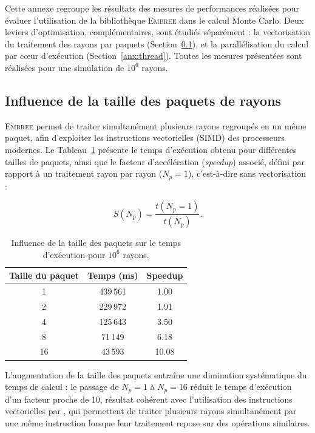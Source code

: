 Cette annexe regroupe les résultats des mesures de performances réalisées pour évaluer l'utilisation de la bibliothèque \textsc{Embree} dans le calcul Monte Carlo. Deux leviers d'optimisation, complémentaires, sont étudiés séparément : la vectorisation du traitement des rayons par paquets (Section~\ref{anx:packet}), et la parallélisation du calcul par c\oe ur d'exécution (Section~\ref{anx:thread}). Toutes les mesures présentées sont réalisées pour une simulation de $10^6$ rayons.

\subsection{Influence de la taille des paquets de rayons}
\label{anx:packet}

\textsc{Embree} permet de traiter simultanément plusieurs rayons regroupés en un même paquet, afin d'exploiter les instructions vectorielles (SIMD) des processeurs modernes. Le Tableau~\ref{tab:packet_perf} présente le temps d'exécution obtenu pour différentes tailles de paquets, ainsi que le facteur d'accélération (\emph{speedup}) associé, défini par rapport à un traitement rayon par rayon ($N_p=1$), c'est-à-dire sans vectorisation :

\begin{equation}
S(N_p)=\frac{t(N_p=1)}{t(N_p)}.
\end{equation}

\begin{table}[H]
\centering
\caption{Influence de la taille des paquets sur le temps d'exécution pour $10^6$ rayons.}
\label{tab:packet_perf}
\begin{tabular}{ccc}
\toprule
Taille du paquet & Temps (ms) & Speedup \\
\midrule
1  & 439\,561 & 1.00 \\
2  & 229\,972 & 1.91 \\
4  & 125\,643 & 3.50 \\
8  & 71\,149  & 6.18 \\
16 & 43\,593  & 10.08 \\
\bottomrule
\end{tabular}
\end{table}

L'augmentation de la taille des paquets entraîne une diminution systématique du temps de calcul : le passage de $N_p=1$ à $N_p=16$ réduit le temps d'exécution d'un facteur proche de 10, résultat cohérent avec l'utilisation des instructions vectorielles par \emb, qui permettent de traiter plusieurs rayons simultanément par une même instruction lorsque leur traitement repose sur des opérations similaires.

